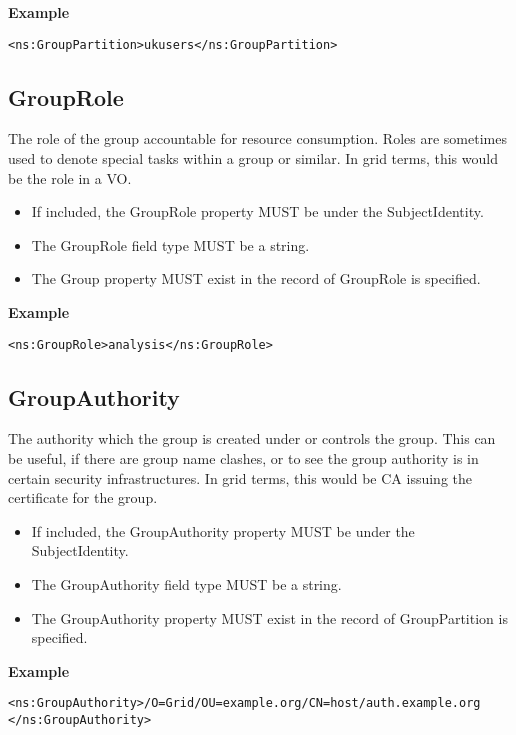 {\bf Example}
\begin{verbatim}
<ns:GroupPartition>ukusers</ns:GroupPartition>
\end{verbatim}


\subsection{GroupRole}

The role of the group accountable for resource consumption. Roles are sometimes
used to denote special tasks within a group or similar. In grid terms, this
would be the role in a VO.

\begin{itemize}
\item If included, the GroupRole property MUST be under the SubjectIdentity.
\item The GroupRole field type MUST be a string.
\item The Group property MUST exist in the record of GroupRole is specified.
\end{itemize}

{\bf Example}
\begin{verbatim}
<ns:GroupRole>analysis</ns:GroupRole>
\end{verbatim}


\subsection{GroupAuthority}

The authority which the group is created under or controls the group. This can
be useful, if there are group name clashes, or to see the group authority is in
certain security infrastructures. In grid terms, this would be CA issuing the
certificate for the group.

\begin{itemize}
\item If included, the GroupAuthority property MUST be under the
SubjectIdentity.
\item The GroupAuthority field type MUST be a string.
\item The GroupAuthority property MUST exist in the record of GroupPartition
    is specified.
\end{itemize}

{\bf Example}
\begin{verbatim}
<ns:GroupAuthority>/O=Grid/OU=example.org/CN=host/auth.example.org
</ns:GroupAuthority>
\end{verbatim}


